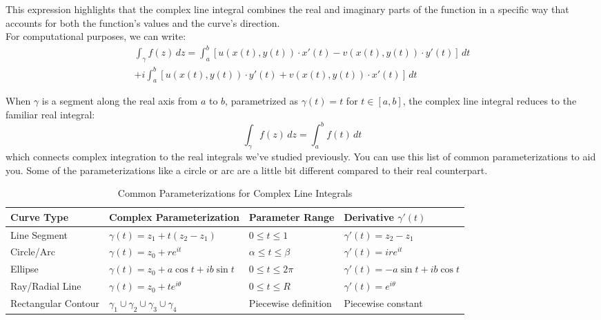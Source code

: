 \noindent This expression highlights that the complex line integral combines the real and imaginary parts of the function in a specific way that accounts for both the function's values and the curve's direction. \\

\noindent For computational purposes, we can write:
\begin{align*}
\int_{\gamma} f(z) \, dz = \int_a^b [u(x(t),y(t)) \cdot x'(t) - v(x(t),y(t)) \cdot y'(t)] \, dt \\
+ i\int_a^b [u(x(t),y(t)) \cdot y'(t) + v(x(t),y(t)) \cdot x'(t)] \, dt
\end{align*}

\noindent When $\gamma$ is a segment along the real axis from $a$ to $b$, parametrized as $\gamma(t) = t$ for $t \in [a,b]$, the complex line integral reduces to the familiar real integral:
\[
\int_{\gamma} f(z) \, dz = \int_a^b f(t) \, dt
\]
which connects complex integration to the real integrals we've studied previously. You can use this list of common parameterizations to aid you. Some of the parameterizations like a circle or arc are a little bit different compared to their real counterpart.

\begin{table}[htb]
\caption{Common Parameterizations for Complex Line Integrals}
\begin{center}
\small
\begin{tabular}{|p{2.5cm}|p{4.5cm}|p{3cm}|p{3.5cm}|}
\hline
\rule{0pt}{4ex}\textbf{Curve Type} & \textbf{Complex Parameterization} & \textbf{Parameter Range} & \textbf{Derivative $\gamma'(t)$} \rule[-2ex]{0pt}{0pt}\\
\hline
\rule{0pt}{4ex}Line Segment &
$\gamma(t) = z_1 + t(z_2-z_1)$ &
$0 \leq t \leq 1$ &
$\gamma'(t) = z_2 - z_1$ \rule[-2ex]{0pt}{0pt}\\
\hline
\rule{0pt}{4ex}Circle/Arc &
$\gamma(t) = z_0 + re^{it}$ &
$\alpha \leq t \leq \beta$ &
$\gamma'(t) = ire^{it}$ \rule[-2ex]{0pt}{0pt}\\
\hline
\rule{0pt}{4ex}Ellipse &
$\gamma(t) = z_0 + a\cos t + ib\sin t$ &
$0 \leq t \leq 2\pi$ &
$\gamma'(t) = -a\sin t + ib\cos t$ \rule[-2ex]{0pt}{0pt}\\
\hline
\rule{0pt}{4ex}Ray/Radial Line &
$\gamma(t) = z_0 + te^{i\theta}$ &
$0 \leq t \leq R$ &
$\gamma'(t) = e^{i\theta}$ \rule[-2ex]{0pt}{0pt}\\
\hline
\rule{0pt}{4ex}Rectangular Contour &
$\gamma_1 \cup \gamma_2 \cup \gamma_3 \cup \gamma_4$ &
Piecewise definition &
Piecewise constant \rule[-2ex]{0pt}{0pt}\\
\hline
\end{tabular}
\end{center}
\label{tab:complex-curve-parameterizations}
\end{table}

